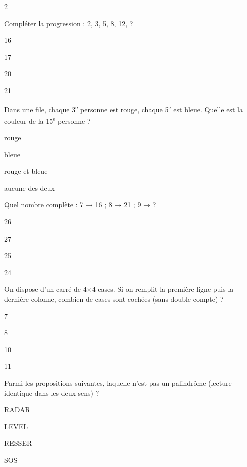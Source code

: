 \begin{multicols}{2}
\begin{question}{}{}
Compléter la progression : 2, 3, 5, 8, 12, ?
\begin{enumeratebf}
\item 16
\item 17
\item 20
\item 21
\end{enumeratebf}
\end{question}

\begin{question}{}{}
Dans une file, chaque 3\textsuperscript{e} personne est rouge, chaque 5\textsuperscript{e} est bleue. Quelle est la couleur de la 15\textsuperscript{e} personne ?
\begin{enumeratebf}
\item rouge
\item bleue
\item rouge et bleue
\item aucune des deux
\end{enumeratebf}
\end{question}

\begin{question}{}{}
Quel nombre complète : 7 → 16 ; 8 → 21 ; 9 → ?
\begin{enumeratebf}
\item 26
\item 27
\item 25
\item 24
\end{enumeratebf}
\end{question}

\begin{question}{}{}
On dispose d’un carré de 4×4 cases. Si on remplit la première ligne puis la dernière colonne, combien de cases sont cochées (sans double-compte) ?
\begin{enumeratebf}
\item 7
\item 8
\item 10
\item 11
\end{enumeratebf}
\end{question}

\begin{question}{}{}
Parmi les propositions suivantes, laquelle n’est pas un palindrôme (lecture identique dans les deux sens) ?
\begin{enumeratebf}
\item RADAR
\item LEVEL
\item RESSER
\item SOS
\end{enumeratebf}
\end{question}


\end{multicols}
